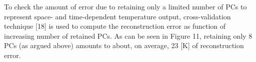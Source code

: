 \documentclass[11pt,titlepage]{article}
\begin{document}



To check the amount of error due to retaining only a limited number of PCs to represent space- and time-dependent temperature output, cross-validation technique [18] is used to compute the reconstruction error as function of increasing number of retained PCs. As can be seen in Figure 11, retaining only 8 PCs (as argued above) amounts to about, on average, 23 [K] of reconstruction error.

\end{document}
